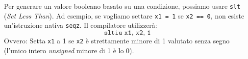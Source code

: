 \begin{remark}
Per generare un valore booleano basato su una condizione, possiamo usare \texttt{slt} (\textit{Set Less Than}). 
Ad esempio, se vogliamo settare \texttt{x1 = 1} se \texttt{x2 == 0}, non esiste un'istruzione nativa \texttt{seqz}. Il compilatore utilizzerà:
\[ \texttt{sltiu x1, x2, 1} \]
Ovvero: Setta \texttt{x1} a 1 se \texttt{x2} è strettamente minore di 1 valutato senza segno (l'unico intero \textit{unsigned} minore di 1 è lo 0).
\end{remark}
